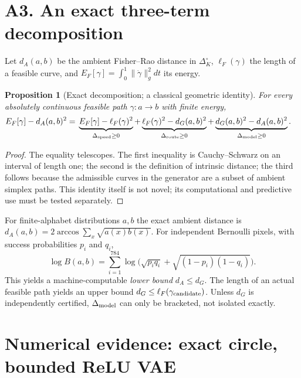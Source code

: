 \documentclass[10pt,a4paper]{article}
\newtheorem{proposition}{Proposition}
\begin{document}
\section{A3. An exact three-term decomposition}
Let $d_A(a,b)$ be the ambient Fisher--Rao distance in $\Delta_K^\circ$, $\ell_F(\gamma)$ the length of a feasible curve, and $E_F[\gamma]=\int_0^1\|\dot\gamma\|_g^2dt$ its energy.
\begin{proposition}[Exact decomposition; a classical geometric identity]
For every absolutely continuous feasible path $\gamma:a\to b$ with finite energy,
\begin{align}\label{eq:gap}
E_F[\gamma]-d_A(a,b)^2
={}&\underbrace{E_F[\gamma]-\ell_F(\gamma)^2}_{\Delta_{\rm speed}\ge0}
+\underbrace{\ell_F(\gamma)^2-d_G(a,b)^2}_{\Delta_{\rm route}\ge0}
+\underbrace{d_G(a,b)^2-d_A(a,b)^2}_{\Delta_{\rm model}\ge0}.
\end{align}
\end{proposition}
\begin{proof}
The equality telescopes. The first inequality is Cauchy--Schwarz on an interval of length one; the second is the definition of intrinsic distance; the third follows because the admissible curves in the generator are a subset of ambient simplex paths. This identity itself is not novel; its computational and predictive use must be tested separately.
\end{proof}
For finite-alphabet distributions $a,b$ the exact ambient distance is $d_A(a,b)=2\arccos\sum_x\sqrt{a(x)b(x)}$. For independent Bernoulli pixels, with success probabilities $p_i$ and $q_i$,
\begin{equation}\label{eq:bhat}
\log B(a,b)=\sum_{i=1}^{784}\log\big(\sqrt{p_iq_i}+\sqrt{(1-p_i)(1-q_i)}\big).
\end{equation}
This yields a machine-computable \emph{lower bound} $d_A\le d_G$. The length of an actual feasible path yields an upper bound $d_G\le\ell_F(\gamma_{\rm candidate})$. Unless $d_G$ is independently certified, $\Delta_{\rm model}$ can only be bracketed, not isolated exactly.

\section{Numerical evidence: exact circle, bounded ReLU VAE}
\end{document}
